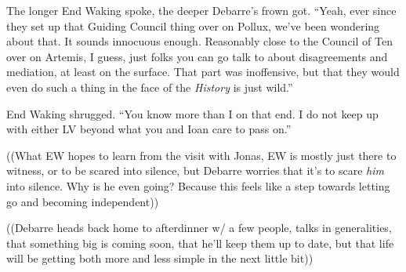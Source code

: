 The longer End Waking spoke, the deeper Debarre's frown got. ``Yeah, ever since they set up that Guiding Council thing over on Pollux, we've been wondering about that. It sounds innocuous enough. Reasonably close to the Council of Ten over on Artemis, I guess, just folks you can go talk to about disagreements and mediation, at least on the surface. That part was inoffensive, but that they would even do such a thing in the face of the \emph{History} is just wild.''

End Waking shrugged. ``You know more than I on that end. I do not keep up with either LV beyond what you and Ioan care to pass on.''

((What EW hopes to learn from the visit with Jonas, EW is mostly just there to witness, or to be scared into silence, but Debarre worries that it's to scare \emph{him} into silence. Why is he even going? Because this feels like a step towards letting go and becoming independent))

((Debarre heads back home to afterdinner w/ a few people, talks in generalities, that something big is coming soon, that he'll keep them up to date, but that life will be getting both more and less simple in the next little bit))
